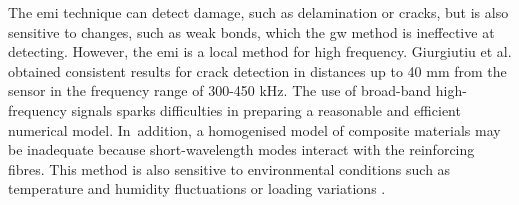 The \ac{emi} technique can detect damage, such as delamination or cracks, but is also sensitive to changes, such as weak bonds, which the \ac{gw} method is ineffective at detecting.
However, the \ac{emi} is a local method for high frequency.
Giurgiutiu et al. \cite{giurgiutiu2001electro} obtained consistent results for crack detection in distances up to 40 \unit{\mm} from the sensor in the frequency range of 300-450 \unit{\kHz}.
The use of broad-band high-frequency signals sparks difficulties in preparing a reasonable and efficient numerical model.
In~addition, a homogenised model of composite materials may be inadequate because short-wavelength modes interact with the reinforcing fibres.
This method is also sensitive to environmental conditions such as temperature and humidity fluctuations \cite{bhalla2002practical} or loading variations \cite{lim2011impedance}.